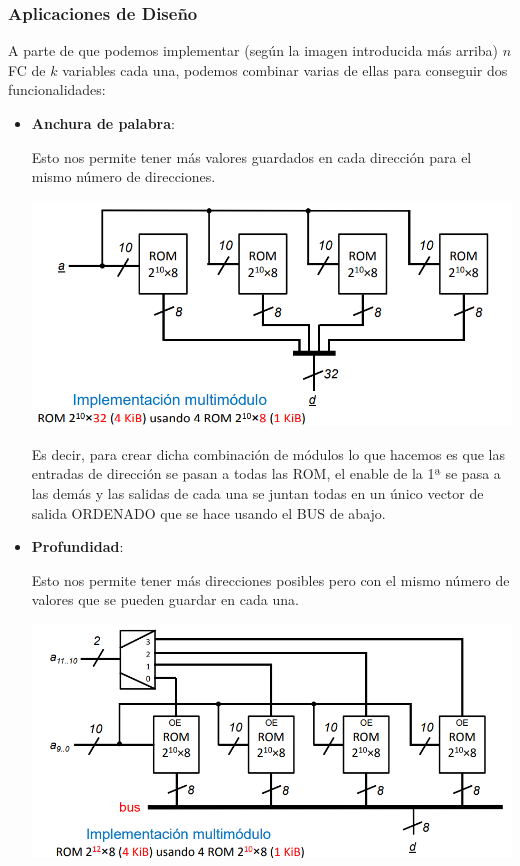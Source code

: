 \documentclass[a4paper,10pt]{book}
\begin{document}
\subsubsection*{Aplicaciones de Diseño}
A parte de que podemos implementar (según la imagen introducida más arriba) $n$ FC de $k$ variables cada una, podemos combinar varias de ellas para conseguir dos funcionalidades:
\begin{itemize}
\item \textbf{Anchura de palabra}:\par
	Esto nos permite tener más valores guardados en cada dirección para el mismo número de direcciones.

\begin{center}
\includegraphics[scale=0.60]{ROM anchura palabra}
\end{center}

Es decir, para crear dicha combinación de módulos lo que hacemos es que las entradas de dirección se pasan a todas las ROM, el enable de la 1ª se pasa a las demás y las salidas de cada una se juntan todas en un único vector de salida ORDENADO que se hace usando el BUS de abajo.

\item \textbf{Profundidad}:\par
Esto nos permite tener más direcciones posibles pero con el mismo número de valores que se pueden guardar en cada una.

\begin{center}
\includegraphics[scale=0.55]{ROM profundidad}
\end{center}


\end{itemize}
\end{document}
